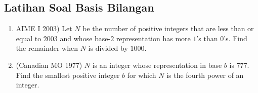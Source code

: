 \subsection{Latihan Soal Basis Bilangan}
\begin{enumerate}
    \item AIME I 2003) Let $N$ be the number of positive integers that are less than or equal to $2003$ and whose base-$2$ representation has more $1$'s than $0$'s. Find the remainder when $N$ is divided by $1000$.

    \item (Canadian MO 1977) $N$ is an integer whose representation in base $b$ is $777.$ Find the smallest positive integer $b$ for which $N$ is the fourth power of an integer.
\end{enumerate}